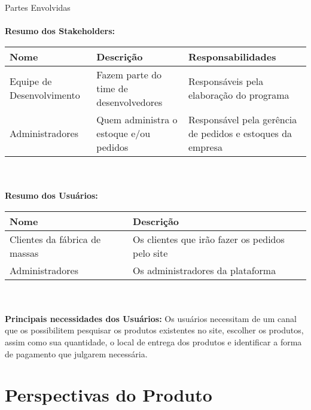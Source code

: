 \begin{apendicesenv}
\begin{tabular}{|l|p{3in}|}
\end{tabular}

\large Partes Envolvidas \\
\tab \\
\textbf{Resumo dos Stakeholders:}  \\

\begin{tabular}{|p{1.5in}|p{1.5in}|p{1.5in}|}
  \hline
  \textbf{Nome} & \textbf{Descrição} & \textbf{Responsabilidades} \\ \hline
  Equipe de Desenvolvimento & Fazem parte do time de desenvolvedores & Responsáveis pela elaboração do programa \\ \hline
  Administradores & Quem administra o estoque e/ou pedidos & Responsável pela gerência de pedidos e estoques da empresa \\ \hline

\end{tabular} \\
\tab \\
\textbf{Resumo dos Usuários:}  \\

\begin{tabular}{|l|p{3in}|}
  \hline
  \textbf{Nome} & \textbf{Descrição} \\ \hline
  Clientes da fábrica de massas & Os clientes que irão fazer os pedidos pelo site \\ \hline
  Administradores & Os administradores da plataforma \\ \hline

\end{tabular}
\tab \\ \\
\textbf{Principais necessidades dos Usuários:} Os usuários necessitam de um canal que os possibilitem pesquisar os produtos existentes no site, escolher os produtos, assim como sua quantidade, o local de entrega dos produtos e identificar a forma de pagamento que julgarem necessária.   \\

{\large {\section { Perspectivas do Produto\\ } } }


\end{apendicesenv}
